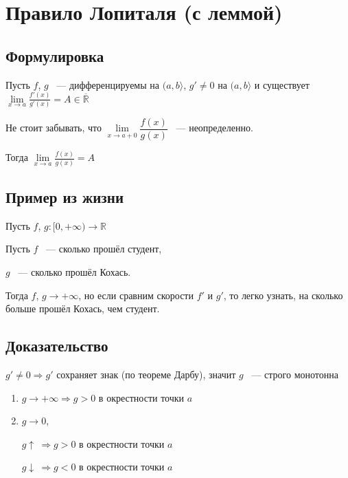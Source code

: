 \documentclass{article}
\begin{document}
	\newpage
	
	\section{Правило Лопиталя (с леммой)}
	
		\subsection{Формулировка}
			
			Пусть $f$, $g$ ~--- дифференцируемы на $(a, b \rangle$, $g' \neq 0$ на $(a, b \rangle$ и существует $\lim\limits_{x \rightarrow a} \frac{f'(x)}{g'(x)} = A \in \overline{\mathbb{R}}$
			
			Не стоит забывать, что $\lim\limits_{x \rightarrow a + 0} \dfrac{f(x)}{g(x)}$ ~--- неопределенно.
			
			Тогда $\lim\limits_{x \rightarrow a} \frac{f(x)}{g(x)} = A$
			
		\subsection{Пример из жизни}
		
			Пусть $f$, $g : [0, +\infty) \rightarrow \mathbb{R}$
			
			Пусть $f$ ~--- сколько прошёл студент, 	
			
				$g$ ~--- сколько прошёл Кохась.
				
			Тогда $f$, $g \rightarrow +\infty$, но если сравним скорости $f'$ и $g'$, то легко узнать, на сколько больше прошёл Кохась, чем студент.
			
		\subsection{Доказательство}
		
			$g' \neq 0 \Rightarrow g'$ сохраняет знак (по теореме Дарбу), значит $g$ ~--- строго монотонна
			
			\begin{enumerate}
			
				\item $g \rightarrow +\infty \Rightarrow g > 0$ в окрестности точки $a$
				
				\item $g \rightarrow 0$,
					
					$g \uparrow \ \Rightarrow g > 0$ в окрестности точки $a$
			
					$g \downarrow \ \Rightarrow g < 0$ в окрестности точки $a$
					
			\end{enumerate}
			
\end{document}
